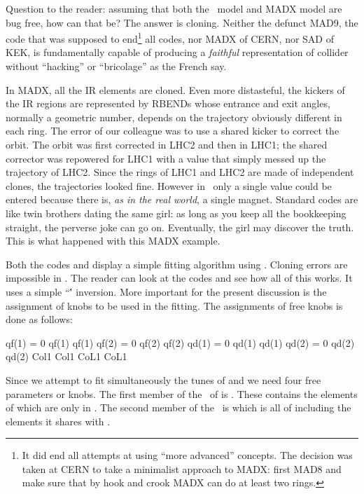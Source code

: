 {Question to the reader: assuming that both the \PTC\ model and MADX model are bug free, how can that be? The answer is cloning. Neither the defunct MAD9, the code that was supposed to end\footnote{It did end all attempts at using ``more advanced'' concepts. The decision was taken at CERN to take a minimalist approach to MADX: first MAD8 and make sure that by hook and crook MADX can do at least two rings.} all codes, nor MADX of CERN, nor SAD of KEK, is fundamentally capable of producing a \emph{faithful} representation of collider without ``hacking'' or ``bricolage'' as the French say.

In MADX, all the IR elements are cloned. Even more distasteful, the kickers of the IR regions are represented by RBENDs whose entrance and exit angles, normally a geometric number, depends on the trajectory obviously different in each ring. The error of our colleague was to use a shared kicker to correct the orbit. The orbit was first corrected in LHC2 and then in LHC1; the shared corrector was repowered for LHC1 with a value that simply messed up the trajectory of LHC2.  Since the rings of LHC1 and LHC2 are made of independent clones, the trajectories looked fine. However in \PTC\ only a single value could be entered because there is, \emph{ as in the real world}, a single magnet. Standard codes are like twin brothers  dating the same girl: as long as you keep all the bookkeeping straight, the perverse joke can go on. Eventually, the girl  may discover the truth. This is what happened with this MADX example. 


Both the codes  and  display a simple fitting algorithm using \TPSA . Cloning errors are impossible in \PTC .
The reader can look at the codes and see how all of this  works. It uses a simple ``\TPSA\'' inversion. More important for the present discussion is the assignment of knobs to be used in the fitting. The assignments of free knobs is done as follows:


\begin{ptccode}
qf(1) = 0
qf(1)%
qf(1)%
qf(2) = 0
qf(2)%
qf(2)%
qd(1) = 0
qd(1)%
qd(1)%
qd(2) = 0
qd(2)%
qd(2)%
Col1%
Col1%
CoL1%
CoL1%
\end{ptccode}

Since we attempt to fit simultaneously the tunes of  and  we need four free parameters or knobs. The first member of the \DNA\ of  is . These contains the elements of   which are only in . The second member of the \DNA\ is  which is all of  including the elements it shares with . 

}
